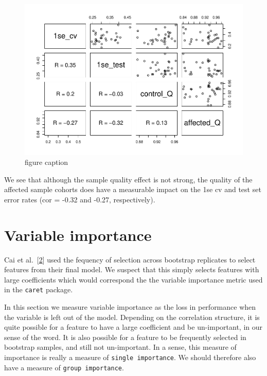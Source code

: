 \documentclass[
]{book}
\begin{document}
\begin{figure}
\centering
\includegraphics{Static/figures/small-sample-qual-1.pdf}
\caption{\label{fig:small-sample-qual}figure caption}
\end{figure}

We see that although the sample quality effect is not strong, the quality of the
affected sample cohorts does have a measurable impact on the 1se cv and test set error
rates (cor = -0.32 and -0.27, respectively).

\hypertarget{variable-importance}{%
\chapter{Variable importance}\label{variable-importance}}

Cai et al.~{[}\protect\hyperlink{ref-Cai:2019aa}{2}{]} used the fequency of selection across
bootstrap replicates to select features from their final model.
We suspect that this simply selects features with large coefficients
which would correspond the the variable importance metric
used in the \texttt{caret} package.

In this section we measure variable importance as the loss in performance when the variable is left out
of the model. Depending on the correlation structure, it is quite possible
for a feature to have a large coefficient and be un-important, in our sense of the word.
It is also possible for a feature to be frequently selected in bootstrap samples, and
still not un-important. In a sense, this measure of importance is really a measure
of \texttt{single\ importance}. We should therefore also have a measure of \texttt{group\ importance}.
\end{document}
